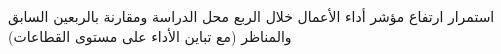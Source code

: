 استمرار ارتفاع مؤشر أداء الأعمال خلال الربع محل الدراسة ومقارنة بالربعين السابق والمناظر (مع تباين الأداء على مستوى القطاعات)
